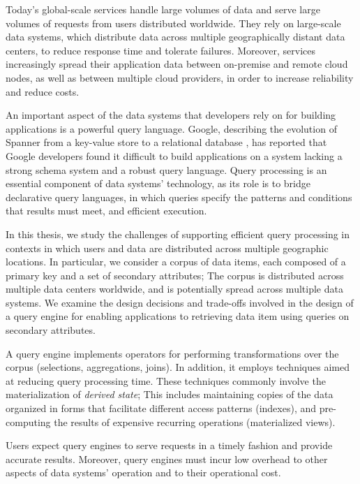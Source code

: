 
Today's global-scale services handle large volumes of data and serve large volumes of requests from users distributed worldwide.
They rely on large-scale data systems,
which distribute data across multiple geographically distant data centers,
to reduce response time and tolerate failures.
Moreover, services increasingly spread their application data between on-premise and remote cloud nodes,
as well as between multiple cloud providers, in order to increase reliability and reduce costs.

An important aspect of the data systems that developers rely on for building applications is a powerful query language.
Google, describing the evolution of Spanner from a key-value store to a relational database \cite{corbett:spanner},
has reported that Google developers found it difficult to build applications on a system lacking a strong schema system
and a robust query language.
Query processing is an essential component of data systems' technology, as its role is to bridge declarative query languages,
in which queries specify the patterns and conditions that results must meet, and efficient execution.

\bigskip
\noindent
In this thesis, we study the challenges of supporting efficient query processing in contexts in which users and data are
distributed across multiple geographic locations.
In particular, we consider a corpus of data items, each composed of a primary key and a set of secondary attributes;
The corpus is distributed across multiple data centers worldwide, and is potentially spread across multiple data systems.
We examine the design decisions and trade-offs involved in the design of a query engine for enabling applications to
retrieving data item using queries on secondary attributes.

A query engine implements operators for performing transformations over the corpus (selections, aggregations, joins).
In addition, it employs techniques aimed at reducing query processing time.
These techniques commonly involve the materialization of \textit{derived state};
This includes maintaining copies of the data organized in forms that facilitate different access patterns (indexes),
and pre-computing the results of expensive recurring operations (materialized views).

\bigskip
\noindent
Users expect query engines to serve requests in a timely fashion and provide accurate results.
Moreover, query engines must incur low overhead to other aspects of data systems' operation and to their operational cost.

